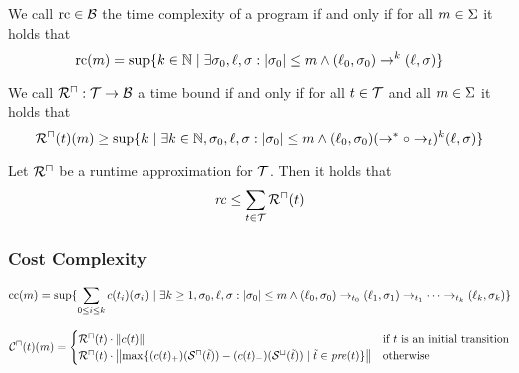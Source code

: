 \begin{definition}
  We call $\text{rc} \in \mathcal{B}$ the time complexity of a program if and only if for all $m \in \Sigma$ it holds that
  \[ \text{rc}(m) = \sup \lbrace  k \in \mathbb{N} \mid \exists \sigma_0, \ell, \sigma: \left|\sigma_0\right| \leq m \wedge (\ell_0, \sigma_0) \rightarrow^k (\ell, \sigma)  \rbrace \]
\end{definition}

\begin{definition}
  We call ${\mathcal{R}^\sqcap}: \mathcal{T} \rightarrow \mathcal{B}$ a time bound if and only if for all $t \in \mathcal{T}$ and all $m \in \Sigma$ it holds that
  \[ {\mathcal{R}^\sqcap}(t)(m) \geq \sup \lbrace  k \mid \exists k \in \mathbb{N}, \sigma_0, \ell, \sigma: \left|\sigma_0\right| \leq m \wedge (\ell_0, \sigma_0) (\rightarrow^* \circ \rightarrow_t)^k (\ell, \sigma)  \rbrace \]
\end{definition}

\begin{theorem}
	Let ${\mathcal{R}^\sqcap}$ be a runtime approximation for $\mathcal{T}$.
	Then it holds that 
	\[ \mathit{rc} \leq \sum_{t \in \mathcal{T}}{\mathcal{R}^\sqcap}(t) \]
\end{theorem}

\subsubsection{Cost Complexity}

\begin{definition}
\[ \text{cc}(m) = \sup \lbrace  \sum_{0 \leq i \leq k} c(t_i)(\sigma_i) \mid \exists k \geq 1, \sigma_0, \ell, \sigma: \left|\sigma_0\right| \leq m \wedge
  (\ell_0, \sigma_0) \rightarrow_{t_0} (\ell_1, \sigma_1) \rightarrow_{t_1} \dots \rightarrow_{t_k} (\ell_k, \sigma_k)  \rbrace \]
\end{definition}

\begin{definition}
  \[ {\mathcal{C}^\sqcap}(t)(m) =
  \begin{cases}
    {\mathcal{R}^\sqcap}(t) \cdot \left\Vert c(t)\right\Vert & \text{if } t \text{ is an initial transition} \\
    {\mathcal{R}^\sqcap}(t) \cdot \left\Vert\max \lbrace (c(t)_+)({\mathcal{S}^\sqcap}(\tilde{t})) - (c(t)_-)({\mathcal{S}^\sqcup}(\tilde{t})) \mid \tilde{t} \in \mathit{pre}(t) \rbrace\right\Vert & \text{otherwise}
  \end{cases}
  \]
\end{definition}

